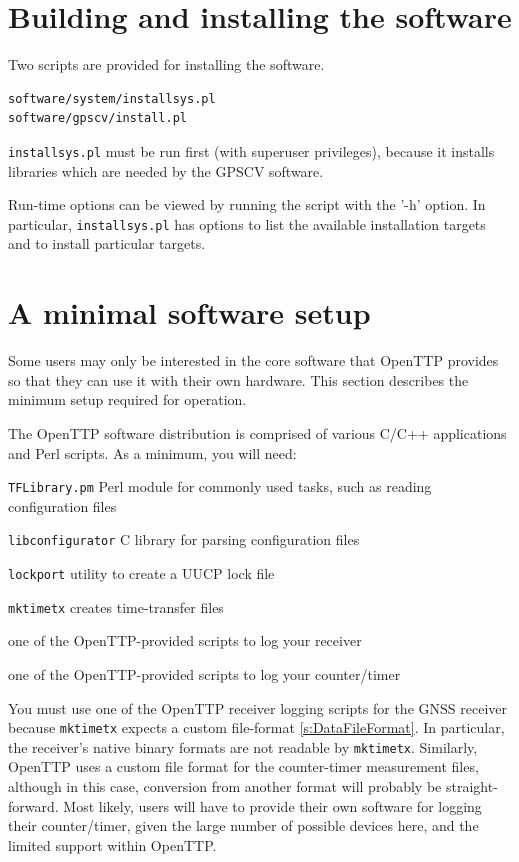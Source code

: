 \documentclass[11pt,a4paper,openany,oneside]{book}
\newcommand{\cc}[1]{{\texttt{#1}}}
\newenvironment{description*}%
  {\setlength{\parskip}{0pt}%
	 \begin{description}%
		\setlength{\topsep}{-12pt}%
		\setlength{\itemindent}{-12pt}%
    \setlength{\itemsep}{0pt}%
		\setlength{\itemsep}{0pt}}%
  {\end{description}}
\begin{document}
\section{Building and installing the software}

Two scripts are provided for installing the software.
\begin{lstlisting}
software/system/installsys.pl
software/gpscv/install.pl
\end{lstlisting}

\cc{installsys.pl} must be run first (with superuser privileges), 
because it installs libraries which are needed by the GPSCV software.

Run-time options can be viewed by running the script with the '-h' option. In particular, \cc{installsys.pl}
has options to list the available installation targets and to install particular targets.

\section{A minimal software setup}

Some users may only be interested in the core software that OpenTTP provides so that they can use
it with their own hardware. This section describes the minimum setup required for operation.

The OpenTTP software distribution is comprised of various C/C++ applications and Perl scripts.
As a minimum, you will need:
\begin{description*}
	\item \cc{TFLibrary.pm} Perl module for commonly used tasks, such as reading configuration files
	\item \cc{libconfigurator} C library for parsing configuration files
	\item \cc{lockport} utility to create a UUCP lock file
	\item \cc{mktimetx} creates time-transfer files
	\item one of the OpenTTP-provided scripts to log your receiver
	\item one of the OpenTTP-provided scripts to log your counter/timer
\end{description*}

You must use one of the OpenTTP receiver logging scripts for the GNSS receiver because \cc{mktimetx}
expects a custom file-format \ref{s:DataFileFormat}. In particular, the
receiver's native binary formats are not readable by \cc{mktimetx}. Similarly, OpenTTP uses a custom file
format for the counter-timer measurement files, although in this case, conversion from another format
will probably be straight-forward. Most likely, users will have to provide their own software for
logging their counter/timer, given the large number of possible devices here, and the limited
support within OpenTTP.
\end{document}
